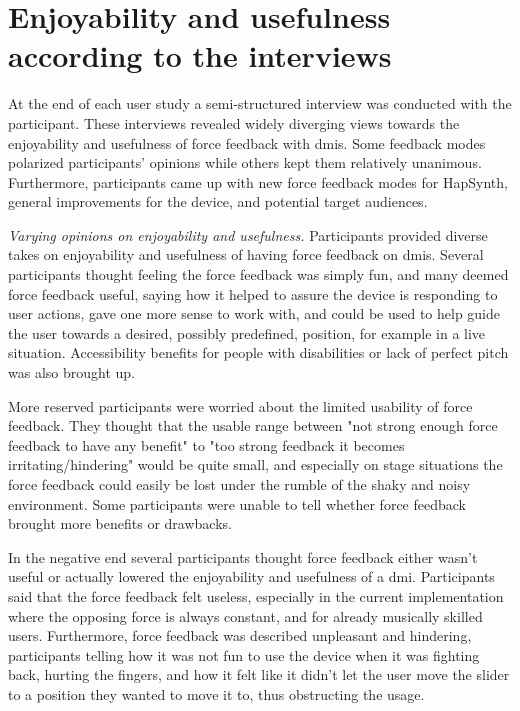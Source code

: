 \section{Enjoyability and usefulness according to the interviews}

At the end of each user study a semi-structured interview was conducted with the participant. These interviews revealed widely diverging views towards the enjoyability and usefulness of force feedback with \glspl{dmi}. Some feedback modes polarized participants' opinions while others kept them relatively unanimous. Furthermore, participants came up with new force feedback modes for HapSynth, general improvements for the device, and potential target audiences.

\textit{Varying opinions on enjoyability and usefulness.} Participants provided diverse takes on enjoyability and usefulness of having force feedback on \glspl{dmi}. Several participants thought feeling the force feedback was simply fun, and many deemed force feedback useful, saying how it helped to assure the device is responding to user actions, gave one more sense to work with, and could be used to help guide the user towards a desired, possibly predefined, position, for example in a live situation. Accessibility benefits for people with disabilities or lack of perfect pitch was also brought up.

More reserved participants were worried about the limited usability of force feedback. They thought that the usable range between "not strong enough force feedback to have any benefit" to "too strong feedback it becomes irritating/hindering" would be quite small, and especially on stage situations the force feedback could easily be lost under the rumble of the shaky and noisy environment. Some participants were unable to tell whether force feedback brought more benefits or drawbacks.

In the negative end several participants thought force feedback either wasn't useful or actually lowered the enjoyability and usefulness of a \gls{dmi}. Participants said that the force feedback felt useless, especially in the current implementation where the opposing force is always constant, and for already musically skilled users. Furthermore, force feedback was described unpleasant and hindering, participants telling how it was not fun to use the device when it was fighting back, hurting the fingers, and how it felt like it didn't let the user move the slider to a position they wanted to move it to, thus obstructing the usage.

